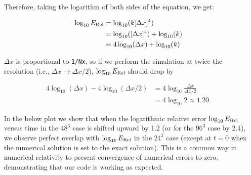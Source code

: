 \documentclass[landscape,letterpaper,10pt,english]{article}
\begin{document}
Therefore, taking the logarithm of both sides of the equation, we get:

\begin{align}
\log_{10} E_{\rm Rel} &= \log_{10} (k [\Delta x]^4) \\
&= \log_{10} ([\Delta x]^4) + \log_{10} (k) \\
&= 4 \log_{10} (\Delta x) + \log_{10} (k)
\end{align}

\(\Delta x\) is proportional to \texttt{1/Nx}, so if we perform the
simulation at twice the resolution (i.e., \(\Delta x\to \Delta x/2\)),
\(\log_{10} E_{\rm Rel}\) should drop by

\begin{align}
4 \log_{10} (\Delta x) - 4 \log_{10} (\Delta x/2) &= 4 \log_{10} \frac{\Delta x}{\Delta x/2} \\
&= 4 \log_{10} 2 \approx 1.20.
\end{align}

In the below plot we show that when the logarithmic relative error
\(\log_{10} E_{\rm Rel}\) versus time in the \(48^3\) case is shifted
upward by 1.2 (or for the \(96^3\) case by 2.4), we observe perfect
overlap with \(\log_{10} E_{\rm Rel}\) in the \(24^3\) case (except at
\(t=0\) when the numerical solution is set to the exact solution). This
is a common way in numerical relativity to present convergence of
numerical errors to zero, demonstrating that our code is working as
expected.
\end{document}
